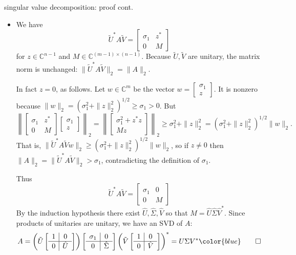 \documentclass[10pt,hyperref]{beamer}
\newcommand{\CC}{\mathbb{C}}
\newcommand{\ds}{\displaystyle}
\newcommand{\blocktwo}[4]{\left[\begin{array}{c|c} #1 & #2 \\ \hline #3 & #4 \end{array}\right]}
\newcommand{\bqed}{{\color{blue}\qed}}
\begin{document}
\begin{frame}{singular value decomposition: proof cont.}

\begin{itemize}
\footnotesize
\item[\emph{cont.}] We have
    $$\tilde U^*A\tilde V = \blocktwo{\sigma_1}{z^*}{0}{M}$$
for $z\in \CC^{n-1}$ and $M \in \CC^{(m-1)\times(n-1)}$.  Because $\tilde U,\tilde V$ are unitary, the matrix norm is unchanged: $\|\tilde U^*A\tilde V\|_2=\|A\|_2$.

\quad In fact $z=0$, as follows.  Let $w\in \CC^m$ be the vector $\ds w = \begin{bmatrix} \sigma_1 \\ z \end{bmatrix}$.  It is nonzero because $\|w\|_2 = (\sigma_1^2 + \|z\|_2^2)^{1/2} \ge \sigma_1>0$.  But
	$$\left\|\blocktwo{\sigma_1}{z^*}{0}{M} \begin{bmatrix} \sigma_1 \\ z \end{bmatrix}\right\|_2 = \left\|\begin{bmatrix} \sigma_1^2 + z^*z \\ Mz \end{bmatrix}\right\|_2 \ge \sigma_1^2 + \|z\|_2^2 = (\sigma_1^2 + \|z\|_2^2)^{1/2} \|w\|_2.$$
That is, $\|\tilde U^*A\tilde V w\|_2 \ge (\sigma_1^2 + \|z\|_2^2)^{1/2} \|w\|_2$, so if $z\ne 0$ then $\|A\|_2=\|\tilde U^*A\tilde V\|_2 > \sigma_1$, contradicting the definition of $\sigma_1$.

\quad Thus 
    $$\tilde U^*A\tilde V = \blocktwo{\sigma_1}{0}{0}{M}$$
By the induction hypothesis there exist $\hat U,\hat\Sigma,\hat V$ so that $M = \hat U \hat\Sigma \hat V^*$.  Since products of unitaries are unitary, we have an SVD of $A$:
    $$A = \left(\tilde U\blocktwo{1}{0}{0}{\hat U}\right) \blocktwo{\sigma_1}{0}{0}{\hat\Sigma} \left(\tilde V \blocktwo{1}{0}{0}{\hat V}\right)^* = U \Sigma V^*\hfill \bqed$$
\normalsize
\end{itemize}
\end{frame}
\end{document}
